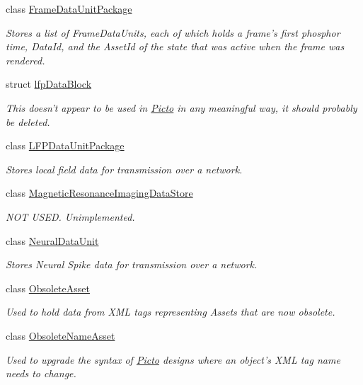 \begin{DoxyCompactItemize}
class \hyperlink{class_picto_1_1_frame_data_unit_package}{Frame\-Data\-Unit\-Package}
\begin{DoxyCompactList}\small\item\em Stores a list of Frame\-Data\-Units, each of which holds a frame's first phosphor time, Data\-Id, and the Asset\-Id of the state that was active when the frame was rendered. \end{DoxyCompactList}\item 
struct \hyperlink{struct_picto_1_1lfp_data_block}{lfp\-Data\-Block}
\begin{DoxyCompactList}\small\item\em This doesn't appear to be used in \hyperlink{namespace_picto}{Picto} in any meaningful way, it should probably be deleted. \end{DoxyCompactList}\item 
class \hyperlink{class_picto_1_1_l_f_p_data_unit_package}{L\-F\-P\-Data\-Unit\-Package}
\begin{DoxyCompactList}\small\item\em Stores local field data for transmission over a network. \end{DoxyCompactList}\item 
class \hyperlink{class_picto_1_1_magnetic_resonance_imaging_data_store}{Magnetic\-Resonance\-Imaging\-Data\-Store}
\begin{DoxyCompactList}\small\item\em N\-O\-T U\-S\-E\-D. Unimplemented. \end{DoxyCompactList}\item 
class \hyperlink{class_picto_1_1_neural_data_unit}{Neural\-Data\-Unit}
\begin{DoxyCompactList}\small\item\em Stores Neural Spike data for transmission over a network. \end{DoxyCompactList}\item 
class \hyperlink{class_picto_1_1_obsolete_asset}{Obsolete\-Asset}
\begin{DoxyCompactList}\small\item\em Used to hold data from X\-M\-L tags representing Assets that are now obsolete. \end{DoxyCompactList}\item 
class \hyperlink{class_picto_1_1_obsolete_name_asset}{Obsolete\-Name\-Asset}
\begin{DoxyCompactList}\small\item\em Used to upgrade the syntax of \hyperlink{namespace_picto}{Picto} designs where an object's X\-M\-L tag name needs to change. \end{DoxyCompactList}\item 

\end{DoxyCompactItemize}
